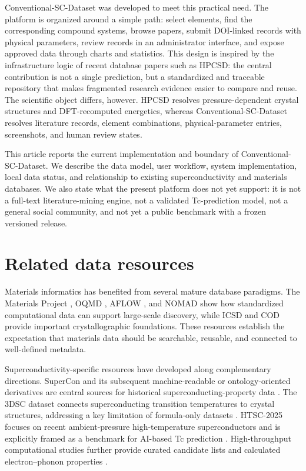 \documentclass[11pt,a4paper]{article}
\begin{document}
Conventional-SC-Dataset was developed to meet this practical need. The platform is organized around a simple path: select elements, find the corresponding compound systems, browse papers, submit DOI-linked records with physical parameters, review records in an administrator interface, and expose approved data through charts and statistics. This design is inspired by the infrastructure logic of recent database papers such as HPCSD: the central contribution is not a single prediction, but a standardized and traceable repository that makes fragmented research evidence easier to compare and reuse. The scientific object differs, however. HPCSD resolves pressure-dependent crystal structures and DFT-recomputed energetics, whereas Conventional-SC-Dataset resolves literature records, element combinations, physical-parameter entries, screenshots, and human review states.

This article reports the current implementation and boundary of Conventional-SC-Dataset. We describe the data model, user workflow, system implementation, local data status, and relationship to existing superconductivity and materials databases. We also state what the present platform does not yet support: it is not a full-text literature-mining engine, not a validated Tc-prediction model, not a general social community, and not yet a public benchmark with a frozen versioned release.

\section{Related data resources}

Materials informatics has benefited from several mature database paradigms. The Materials Project \cite{jain2013materialsproject}, OQMD \cite{kirklin2015oqmd}, AFLOW \cite{curtarolo2015aflow}, and NOMAD \cite{draxl2018nomad} show how standardized computational data can support large-scale discovery, while ICSD \cite{belsky2002icsd} and COD \cite{grazulis2012cod} provide important crystallographic foundations. These resources establish the expectation that materials data should be searchable, reusable, and connected to well-defined metadata.

Superconductivity-specific resources have developed along complementary directions. SuperCon and its subsequent machine-readable or ontology-oriented derivatives are central sources for historical superconducting-property data \cite{nimsSupercon,foppiano2023supercon2,ishii2023ontology}. The 3DSC dataset connects superconducting transition temperatures to crystal structures, addressing a key limitation of formula-only datasets \cite{sommer2023threedsc}. HTSC-2025 focuses on recent ambient-pressure high-temperature superconductors and is explicitly framed as a benchmark for AI-based Tc prediction \cite{han2025htsc}. High-throughput computational studies further provide curated candidate lists and calculated electron--phonon properties \cite{bercx2025prxenergy,pires2026ambient}.
\end{document}
